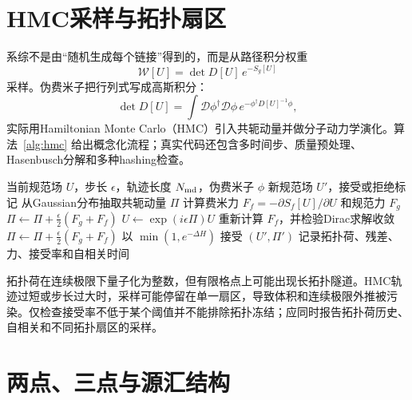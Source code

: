 \documentclass[UTF8,12pt,a4paper,twoside,openany]{ctexbook}
\begin{document}
\section{HMC采样与拓扑扇区}

系综不是由“随机生成每个链接”得到的，而是从路径积分权重
\begin{equation}
  \mathcal W[U]=\det D[U]\,e^{-S_g[U]}
  \label{eq:lattice-weight}
\end{equation}
采样。伪费米子把行列式写成高斯积分：
\begin{equation}
  \det D[U]
  =\int\mathcal D\phi^\dagger\mathcal D\phi\,
  e^{-\phi^\dagger D[U]^{-1}\phi},
  \label{eq:pseudofermion}
\end{equation}
实际用Hamiltonian Monte Carlo（HMC）引入共轭动量并做分子动力学演化。算法~\ref{alg:hmc} 给出概念化流程；真实代码还包含多时间步、质量预处理、Hasenbusch分解和多种hashing检查。

\begin{algorithm}[htbp]
\caption{HMC生成规范组态的概念流程。}
\label{alg:hmc}
\begin{algorithmic}[1]
\Require 当前规范场 \(U\)，步长 \(\epsilon\)，轨迹长度 \(N_{\rm md}\)，伪费米子 \(\phi\)
\Ensure 新规范场 \(U'\)，接受或拒绝标记
\State 从Gaussian分布抽取共轭动量 \(\Pi\)
\State 计算费米力 \(F_f=-\partial S_f[U]/\partial U\) 和规范力 \(F_g\)
  \State \(\Pi\gets\Pi+\frac{\epsilon}{2}(F_g+F_f)\)
  \State \(U\gets\exp(i\epsilon\Pi)U\)
  \State 重新计算 \(F_f\)，并检验Dirac求解收敛
  \State \(\Pi\gets\Pi+\frac{\epsilon}{2}(F_g+F_f)\)
\EndFor
\State 以 \(\min(1,e^{-\Delta H})\) 接受 \((U',\Pi')\)
\State 记录拓扑荷、残差、力、接受率和自相关时间
\end{algorithmic}
\end{algorithm}

拓扑荷在连续极限下量子化为整数，但有限格点上可能出现长拓扑隧道。HMC轨迹过短或步长过大时，采样可能停留在单一扇区，导致体积和连续极限外推被污染。仅检查接受率不低于某个阈值并不能排除拓扑冻结；应同时报告拓扑荷历史、自相关和不同拓扑扇区的采样。

\section{两点、三点与源汇结构}
\end{document}
